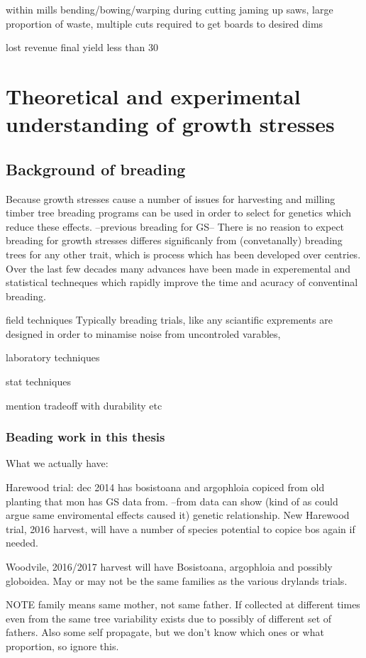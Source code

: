 \documentclass{article}
\begin{document}
within mills
bending/bowing/warping during cutting jaming up saws, large proportion of waste,
multiple cuts required to get boards to desired dims

lost revenue final yield less than 30%


\section{Theoretical and experimental understanding of growth stresses}

\subsection{Background of breading}
Because growth stresses cause a number of issues for harvesting and milling
timber tree breading programs can be used in order to select for genetics which
reduce these effects. --previous breading for GS-- There is no reasion to
expect  breading for growth stresses differes significanly from (convetanally)
breading trees for any other trait, which is process which has been developed
over centries. Over the last few decades many advances have been made in
experemental and statistical techneques which rapidly improve the time and
acuracy of conventinal breading.

 field techniques
Typically breading trials, like any sciantific exprements are designed in order
to minamise noise from uncontroled varables,

laboratory techniques


stat techniques

mention tradeoff with durability etc

\subsubsection{Beading work in this thesis}
What we actually have:

Harewood trial:
dec 2014 has bosistoana and argophloia copiced from old planting that mon has GS
data from. --from data can show (kind of as could argue same enviromental
effects caused it) genetic relationship.
New Harewood trial, 2016 harvest, will
have a number of species potential to copice bos again if needed.

Woodvile, 2016/2017 harvest will have Bosistoana, argophloia and possibly globoidea.
May or may not be the same families as the various drylands trials.

NOTE family means same mother, not same father.
If collected at different times even from the same tree variability exists due
to possibly of different set of fathers. Also some self propagate, but we don't
know which ones or what proportion, so ignore this.
\end{document}
